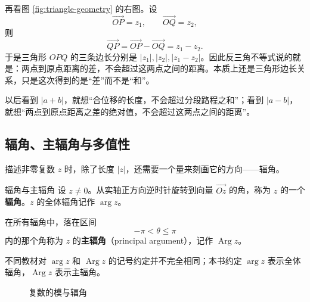 再看图 \ref{fig:triangle-geometry} 的右图。设
\[
\overrightarrow{OP}=z_1,\qquad \overrightarrow{OQ}=z_2,
\]
则
\[
\overrightarrow{QP}=\overrightarrow{OP}-\overrightarrow{OQ}=z_1-z_2.
\]
于是三角形 $OPQ$ 的三条边长分别是 $|z_1|,|z_2|,|z_1-z_2|$。因此反三角不等式说的就是：两点到原点距离的差，不会超过这两点之间的距离。本质上还是三角形边长关系，只是这次得到的是``差''而不是``和''。

\begin{tishi}[看见模不等式时先想图像]
以后看到 $|a+b|$，就想``合位移的长度，不会超过分段路程之和''；看到 $|a-b|$，就想``两点到原点距离之差的绝对值，不会超过这两点之间的距离''。
\end{tishi}

\subsection{辐角、主辐角与多值性}

描述非零复数 $z$ 时，除了长度 $|z|$，还需要一个量来刻画它的方向——辐角。

\begin{dingliyi}{辐角与主辐角}{}
设 $z\neq 0$。从实轴正方向逆时针旋转到向量 $\overrightarrow{Oz}$ 的角，称为 $z$ 的一个\textbf{辐角}。$z$ 的全体辐角记作 $\arg z$。

在所有辐角中，落在区间
\begin{equation}
    -\pi<\theta\le \pi
\end{equation}
内的那个角称为 $z$ 的\textbf{主辐角}（principal argument），记作 $\operatorname{Arg}z$。
\end{dingliyi}

\begin{zhu}{}{}
不同教材对 $\arg z$ 和 $\operatorname{Arg}z$ 的记号约定并不完全相同；本书约定 $\arg z$ 表示全体辐角，$\operatorname{Arg}z$ 表示主辐角。
\end{zhu}

\begin{figure}[htbp]
\centering
{}
\caption{复数的模与辐角}
\label{fig:modulus-argument}
\end{figure}


